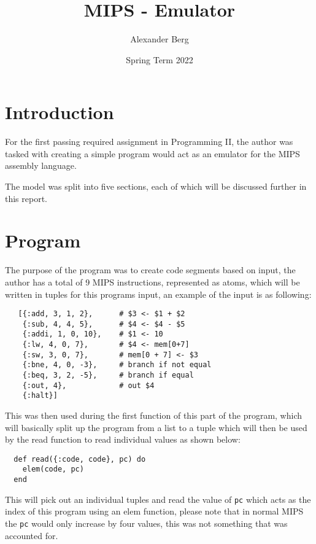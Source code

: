 \documentclass[a4paper,11pt]{article}
\begin{document}
\title{
    \textbf{MIPS - Emulator}
}
\author{Alexander Berg}
\date{Spring Term 2022}

\maketitle

\section*{Introduction}

For the first passing required assignment in Programming II, the author was tasked with creating a simple program would act as an emulator for the MIPS assembly language.

The model was split into five sections, each of which will be discussed further in this report.

\section*{Program}

The purpose of the program was to create code segments based on input, the author has a total of 9 MIPS instructions, represented as atoms, which will be written in tuples for this programs input, an example of the input is as following:

\begin{verbatim}
   [{:add, 3, 1, 2},      # $3 <- $1 + $2
    {:sub, 4, 4, 5},      # $4 <- $4 - $5
    {:addi, 1, 0, 10},    # $1 <- 10 
    {:lw, 4, 0, 7},       # $4 <- mem[0+7]
    {:sw, 3, 0, 7},       # mem[0 + 7] <- $3
    {:bne, 4, 0, -3},     # branch if not equal
    {:beq, 3, 2, -5},     # branch if equal 
    {:out, 4},            # out $4
    {:halt}]
\end{verbatim}

This was then used during the first function of this part of the program, which will basically split up the program from a list to a tuple which will then be used by the read function to read individual values as shown below:

\begin{verbatim}
  def read({:code, code}, pc) do
    elem(code, pc)
  end
\end{verbatim}

This will pick out an individual tuples and read the value of {\tt pc} which acts as the index of this program using an elem function, please note that in normal MIPS the {\tt pc} would only increase by four values, this was not something that was accounted for.
\end{document}
